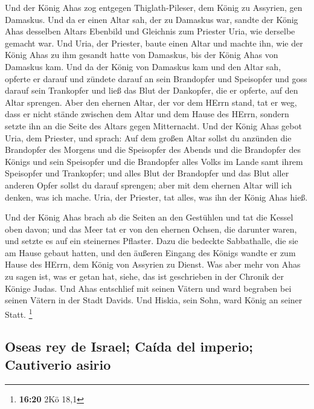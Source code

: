  Und der König Ahas zog entgegen Thiglath-Pileser, dem
König zu Assyrien, gen Damaskus. Und da er einen Altar sah, der zu
Damaskus war, sandte der König Ahas desselben Altars Ebenbild und
Gleichnis zum Priester Uria, wie derselbe gemacht war. 
Und Uria, der Priester, baute einen Altar und machte ihn, wie der König
Ahas zu ihm gesandt hatte von Damaskus, bis der König Ahas von Damaskus
kam.  Und da der König von Damaskus kam und den Altar
sah, opferte er darauf  und zündete darauf an sein
Brandopfer und Speisopfer und goss darauf sein Trankopfer und ließ das
Blut der Dankopfer, die er opferte, auf den Altar sprengen.
 Aber den ehernen Altar, der vor dem HErrn stand, tat er
weg, dass er nicht stände zwischen dem Altar und dem Hause des HErrn,
sondern setzte ihn an die Seite des Altars gegen Mitternacht.
 Und der König Ahas gebot Uria, dem Priester, und sprach:
Auf dem großen Altar sollst du anzünden die Brandopfer des Morgens und
die Speisopfer des Abends und die Brandopfer des Königs und sein
Speisopfer und die Brandopfer alles Volks im Lande samt ihrem Speisopfer
und Trankopfer; und alles Blut der Brandopfer und das Blut aller anderen
Opfer sollst du darauf sprengen; aber mit dem ehernen Altar will ich
denken, was ich mache.  Uria, der Priester, tat alles,
was ihn der König Ahas hieß.

 Und der König Ahas brach ab die Seiten an den Gestühlen
und tat die Kessel oben davon; und das Meer tat er von den ehernen
Ochsen, die darunter waren, und setzte es auf ein steinernes Pflaster.
 Dazu die bedeckte Sabbathalle, die sie am Hause gebaut
hatten, und den äußeren Eingang des Königs wandte er zum Hause des
HErrn, dem König von Assyrien zu Dienst.  Was aber mehr
von Ahas zu sagen ist, was er getan hat, siehe, das ist geschrieben in
der Chronik der Könige Judas.  Und Ahas entschlief mit
seinen Vätern und ward begraben bei seinen Vätern in der Stadt Davids.
Und Hiskia, sein Sohn, ward König an seiner Statt. \footnote{\textbf{16:20}
  2Kö 18,1}

\hypertarget{oseas-rey-de-israel-cauxedda-del-imperio-cautiverio-asirio}{%
\subsection{Oseas rey de Israel; Caída del imperio; Cautiverio
asirio}\label{oseas-rey-de-israel-cauxedda-del-imperio-cautiverio-asirio}}

